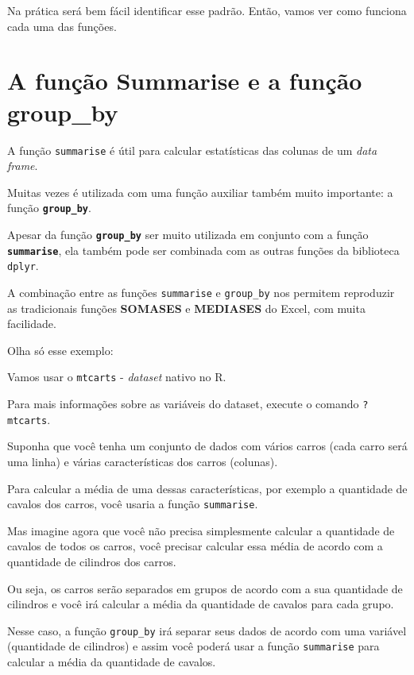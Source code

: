 \documentclass[
]{book}
\begin{document}
Na prática será bem fácil identificar esse padrão. Então, vamos ver como
funciona cada uma das funções.

\hypertarget{a-funuxe7uxe3o-summarise-e-a-funuxe7uxe3o-group_by}{%
\section{A função Summarise e a função
group\_by}\label{a-funuxe7uxe3o-summarise-e-a-funuxe7uxe3o-group_by}}

A função \texttt{summarise} é útil para calcular estatísticas das
colunas de um \emph{data frame}.

Muitas vezes é utilizada com uma função auxiliar também muito
importante: a função \textbf{\texttt{group\_by}}.

Apesar da função \textbf{\texttt{group\_by}} ser muito utilizada em
conjunto com a função \textbf{\texttt{summarise}}, ela também pode ser
combinada com as outras funções da biblioteca \texttt{dplyr}.

A combinação entre as funções \texttt{summarise} e \texttt{group\_by}
nos permitem reproduzir as tradicionais funções \textbf{SOMASES} e
\textbf{MEDIASES} do Excel, com muita facilidade.

Olha só esse exemplo:

Vamos usar o \texttt{mtcarts} - \emph{dataset} nativo no R.

Para mais informações sobre as variáveis do dataset, execute o comando
\texttt{?mtcarts}.

Suponha que você tenha um conjunto de dados com vários carros (cada
carro será uma linha) e várias características dos carros (colunas).

Para calcular a média de uma dessas características, por exemplo a
quantidade de cavalos dos carros, você usaria a função
\texttt{summarise}.

Mas imagine agora que você não precisa simplesmente calcular a
quantidade de cavalos de todos os carros, você precisar calcular essa
média de acordo com a quantidade de cilindros dos carros.

Ou seja, os carros serão separados em grupos de acordo com a sua
quantidade de cilindros e você irá calcular a média da quantidade de
cavalos para cada grupo.

Nesse caso, a função \texttt{group\_by} irá separar seus dados de acordo
com uma variável (quantidade de cilindros) e assim você poderá usar a
função \texttt{summarise} para calcular a média da quantidade de
cavalos.
\end{document}

